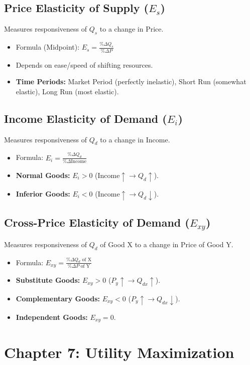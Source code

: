 \documentclass{article}
\begin{document}
\subsection*{Price Elasticity of Supply ($E_s$)}
Measures responsiveness of $Q_s$ to a change in Price.
\begin{itemize}
    \item Formula (Midpoint): $E_s = \frac{\%\Delta Q_s}{\%\Delta P}$
    \item Depends on ease/speed of shifting resources.
    \item \textbf{Time Periods:} Market Period (perfectly inelastic), Short Run (somewhat elastic), Long Run (most elastic).
\end{itemize}

\subsection*{Income Elasticity of Demand ($E_i$)}
Measures responsiveness of $Q_d$ to a change in Income.
\begin{itemize}
    \item Formula: $E_i = \frac{\%\Delta Q_d}{\%\Delta \text{Income}}$
    \item \textbf{Normal Goods:} $E_i > 0$ (Income$\uparrow \rightarrow Q_d\uparrow$).
    \item \textbf{Inferior Goods:} $E_i < 0$ (Income$\uparrow \rightarrow Q_d\downarrow$).
\end{itemize}

\subsection*{Cross-Price Elasticity of Demand ($E_{xy}$)}
Measures responsiveness of $Q_d$ of Good X to a change in Price of Good Y.
\begin{itemize}
    \item Formula: $E_{xy} = \frac{\%\Delta Q_d \text{ of X}}{\%\Delta P \text{ of Y}}$
    \item \textbf{Substitute Goods:} $E_{xy} > 0$ ($P_y\uparrow \rightarrow Q_{dx}\uparrow$).
    \item \textbf{Complementary Goods:} $E_{xy} < 0$ ($P_y\uparrow \rightarrow Q_{dx}\downarrow$).
    \item \textbf{Independent Goods:} $E_{xy} = 0$.
\end{itemize}

\section*{Chapter 7: Utility Maximization}
\end{document}
